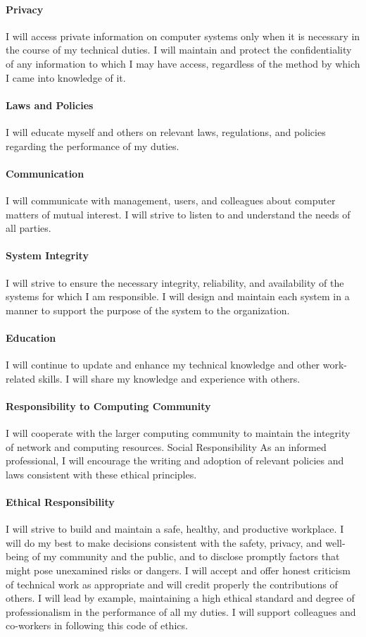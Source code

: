 \documentclass[a4]{article}
\begin{document}
\begin{multicols}{3}
\paragraph{Privacy} I will access private information on computer systems only when it is necessary in the course of
my technical duties. I will maintain and protect the confidentiality of any information to which I may
have access, regardless of the method by which I came into knowledge of it.
\paragraph{Laws and Policies} I will educate myself and others on relevant laws, regulations,
and policies regarding the performance of my duties.

\paragraph{Communication} I will communicate with management, users, and colleagues about computer matters
of mutual interest. I will strive to listen to and understand the needs of all parties.
\paragraph{System Integrity} I will strive to ensure the necessary integrity, reliability, and availability of the systems
for which I am responsible.
I will design and maintain each system in a manner to support the purpose of the system to the
organization.
\paragraph{Education} I will continue to update and enhance my technical knowledge and other work-related skills.
I will share my knowledge and experience with others.
\paragraph{Responsibility to Computing Community} I will cooperate with the larger computing community to
maintain the integrity of network and computing resources.
Social Responsibility As an informed professional, I will encourage the writing and adoption of relevant
policies and laws consistent with these ethical principles.
\paragraph{Ethical Responsibility} I will strive to build and maintain a safe, healthy, and productive workplace.
I will do my best to make decisions consistent with the safety, privacy, and well-being of my community
and the public, and to disclose promptly factors that might pose unexamined risks or dangers.
I will accept and offer honest criticism of technical work as appropriate and will credit properly the
contributions of others.
I will lead by example, maintaining a high ethical standard and degree of professionalism in the
performance of all my duties. I will support colleagues and co-workers in following this code of ethics.
\end{multicols}
\end{document}
